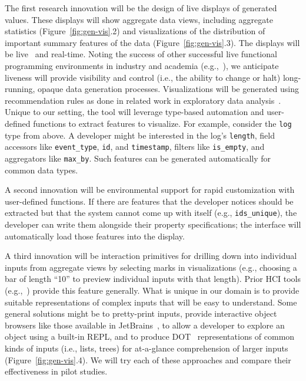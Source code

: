 The first research innovation will be the design of live displays of generated
values. These displays
will show aggregate data views, including aggregate
statistics (Figure~\ref{fig:gen-vis}.2) and visualizations of the distribution
of important summary features of the data (Figure~\ref{fig:gen-vis}.3). The
displays will be live~\cite{ref:tanimoto1990viva} and real-time. Noting the
success of other successful live functional programming environments in industry
and academia
(e.g.,~\cite{tool:lighttable,ref:omar2019live}), we anticipate liveness will
provide visibility and control (i.e., the ability to change or halt)
long-running, opaque data generation processes.  Visualizations will be
generated using recommendation rules as done in related work in exploratory data
analysis~\cite{ref:lee2021lux,wongsuphasawat_voyager_2016,
wongsuphasawat_voyager_2017}. Unique to our setting, the tool will leverage
type-based automation and user-defined functions to extract features to
visualize.
For example, consider the
\lstinline{log} type
from above. A developer might be interested in the log's
\lstinline{length}, field accessors like \lstinline{event_type}, \lstinline{id},
and \lstinline{timestamp}, filters like \lstinline{is_empty}, and
aggregators like \lstinline{max_by}. Such features can be
generated automatically for common data types.

A second innovation will be environmental support for rapid customization with
user-defined functions.  If
there are features that the developer notices should be extracted but that the
system cannot come up with itself (e.g., \lstinline{ids_unique}), the developer
can
write them alongside their property specifications;
the interface will automatically load those features into the
display.

A third innovation will be interaction primitives for drilling down into
individual inputs from aggregate views by selecting marks in visualizations
(e.g., choosing a bar
of length ``10'' to preview individual inputs with that length). Prior HCI tools
(e.g.,~\cite{ref:hohman2019gamut})
provide this feature generally. What is unique in our domain is to provide
suitable representations of complex inputs that
will be easy to understand. Some general solutions might be to
pretty-print inputs, provide interactive object browsers like those available
in JetBrains~\cite{tool:jetbrains}, to allow a developer to explore an
object using a built-in REPL, and to produce
DOT~\cite{ellson_graphviz_2002} representations of common kinds of
inputs (i.e., lists, trees) for at-a-glance comprehension of
larger inputs (Figure~\ref{fig:gen-vis}.4). We will try each of these
approaches and compare their effectiveness in pilot studies.

